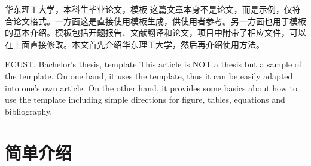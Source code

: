 \documentclass{ecustbachelorthesis}
\begin{document}

\begin{abstractzh}{华东理工大学，本科生毕业论文，模板}
这篇文章本身不是论文，而是示例，仅符合论文格式。一方面这是直接使用模板生成，供使用者参考。另一方面也用于模板的基本介绍。模板包括开题报告、文献翻译和论文，项目中附带了相应文件，可以在上面直接修改。本文首先介绍华东理工大学，然后再介绍使用方法。
\end{abstractzh}

\begin{abstracten}{ECUST, Bachelor's thesis, template}
This article is NOT a thesis but a sample of the template. On one hand, it uses the template, thus it can be easily adapted into one's own article. On the other hand, it provides some basics about how to use the template including simple directions for figure, tables, equations and bibliography.
\end{abstracten}

\mktableofcontents
% 
% 
% 
% 
\chapter{简单介绍}
\end{document}

